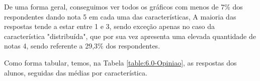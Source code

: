         
        
        

        De uma forma geral, conseguimos ver todos os gráficos com menos de 7\% dos respondentes dando nota 5 em cada uma das características, A maioria das respostas tende a estar entre 1 e 3, sendo exceção apenas no caso da característica "distribuída", que por sua vez apresenta uma elevada quantidade de notas 4, sendo referente a 29,3\% dos respondentes.

        Como forma tabular, temos, na Tabela \ref{table:6.0-Opiniao}, as respostas dos alunos, seguidas das médias por característica.

